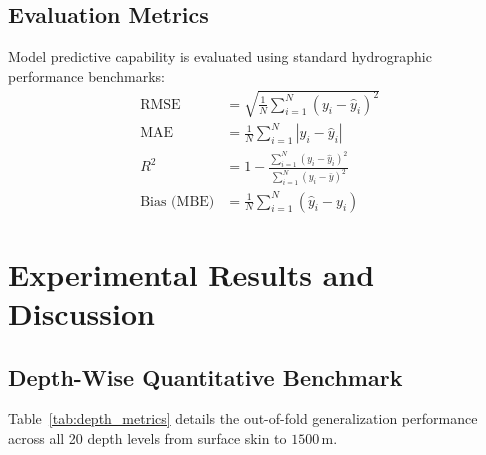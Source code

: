 \documentclass[conference]{IEEEtran}
\begin{document}
\subsection{Evaluation Metrics}
Model predictive capability is evaluated using standard hydrographic performance benchmarks:
\begin{align}
\text{RMSE} &= \sqrt{\frac{1}{N} \sum_{i=1}^N (y_i - \hat{y}_i)^2} \\
\text{MAE} &= \frac{1}{N} \sum_{i=1}^N |y_i - \hat{y}_i| \\
R^2 &= 1 - \frac{\sum_{i=1}^N (y_i - \hat{y}_i)^2}{\sum_{i=1}^N (y_i - \bar{y})^2} \\
\text{Bias (MBE)} &= \frac{1}{N} \sum_{i=1}^N (\hat{y}_i - y_i)
\end{align}

\section{Experimental Results and Discussion}
\label{sec:results}

\subsection{Depth-Wise Quantitative Benchmark}
Table~\ref{tab:depth_metrics} details the out-of-fold generalization performance across all 20 depth levels from surface skin to $1500\,\text{m}$.
\end{document}
